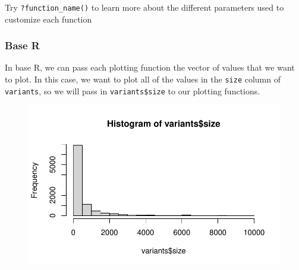 \documentclass[
  letterpaper,
  DIV=11,
  numbers=noendperiod]{scrreprt}
\newenvironment{Shaded}{\begin{snugshade}}{\end{snugshade}}
\newcommand{\DocumentationTok}[1]{\textcolor[rgb]{0.37,0.37,0.37}{\textit{#1}}}
\newcommand{\FunctionTok}[1]{\textcolor[rgb]{0.28,0.35,0.67}{#1}}
\newcommand{\NormalTok}[1]{\textcolor[rgb]{0.00,0.23,0.31}{#1}}
\newcommand{\SpecialCharTok}[1]{\textcolor[rgb]{0.37,0.37,0.37}{#1}}
\begin{document}
\begin{tcolorbox}[enhanced jigsaw, left=2mm, colframe=quarto-callout-tip-color-frame, leftrule=.75mm, opacitybacktitle=0.6, toptitle=1mm, title=\textcolor{quarto-callout-tip-color}{\faLightbulb}\hspace{0.5em}{Tip}, opacityback=0, coltitle=black, colbacktitle=quarto-callout-tip-color!10!white, breakable, colback=white, titlerule=0mm, bottomrule=.15mm, arc=.35mm, bottomtitle=1mm, rightrule=.15mm, toprule=.15mm]

Try \texttt{?function\_name()} to learn more about the different
parameters used to customize each function

\end{tcolorbox}

\hypertarget{base-r-1}{%
\subsubsection{Base R}\label{base-r-1}}

In base R, we can pass each plotting function the vector of values that
we want to plot. In this case, we want to plot all of the values in the
\texttt{size} column of \texttt{variants}, so we will pass in
\texttt{variants\$size} to our plotting functions.

\begin{Shaded}
\end{Shaded}

\begin{figure}[H]

{\centering \includegraphics{scripts/02_dataViz/class3_files/figure-pdf/unnamed-chunk-13-1.pdf}

}

\end{figure}
\end{document}
